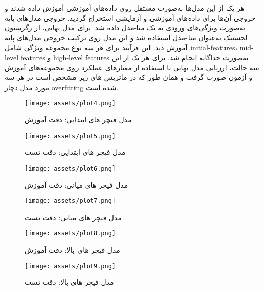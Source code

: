 \documentclass[a4paper,12pt]{article}
\begin{document}
    هر یک از این مدل‌ها به‌صورت مستقل روی داده‌های آموزشی آموزش داده شدند و خروجی آن‌ها برای داده‌های آموزشی و آزمایشی استخراج گردید.
خروجی مدل‌های پایه به‌صورت ویژگی‌های ورودی به یک متا-مدل داده شد. برای مدل نهایی، از رگرسیون لجستیک به‌عنوان متا-مدل استفاده شد و این مدل روی ترکیب خروجی مدل‌های پایه آموزش دید. این فرآیند برای هر سه نوع مجموعه ویژگی شامل initial-features، mid-level features و high-level features به‌صورت جداگانه انجام شد.
برای هر یک از این سه حالت، ارزیابی مدل نهایی با استفاده از معیارهای عملکرد روی مجموعه‌های آموزش و آزمون صورت گرفت و همان طور که در ماتریس های زیر مشخص است در هر سه مورد مدل دچار overfitting شده است.
\pagebreak
\begin{figure}[h]
	\centering
	\begin{minipage}[t]{0.40\textwidth}
		\centering
		\texttt{[image: assets/plot4.png]}
		\caption{\textcolor{CustomAccent}{مدل فیچر های ابتدایی: دقت آموزش }}
	\end{minipage}
	\hfill
	\begin{minipage}[t]{0.40\textwidth}
		\centering
		\texttt{[image: assets/plot5.png]}
		\caption{\textcolor{CustomAccent}{مدل فیچر های ابتدایی: دقت تست}}
	\end{minipage}

	\hfill
\end{figure}

\begin{figure}[h]
	\centering
	\begin{minipage}[t]{0.40\textwidth}
		\centering
		\texttt{[image: assets/plot6.png]}
		\caption{\textcolor{CustomAccent}{مدل فیچر های میانی: دقت آموزش }}
	\end{minipage}
	\hfill
	\begin{minipage}[t]{0.40\textwidth}
		\centering
		\texttt{[image: assets/plot7.png]}
		\caption{\textcolor{CustomAccent}{مدل فیچر های میانی: دقت تست}}
	\end{minipage}

	\hfill
\end{figure}
	
	
\begin{figure}[h]
	\centering
	\begin{minipage}[t]{0.40\textwidth}
		\centering
		\texttt{[image: assets/plot8.png]}
		\caption{\textcolor{CustomAccent}{مدل فیچر های بالا: دقت آموزش }}
	\end{minipage}
	\hfill
	\begin{minipage}[t]{0.40\textwidth}
		\centering
		\texttt{[image: assets/plot9.png]}
		\caption{\textcolor{CustomAccent}{مدل فیچر های بالا: دقت تست}}
	\end{minipage}

	\hfill
\end{figure}
\end{document}
